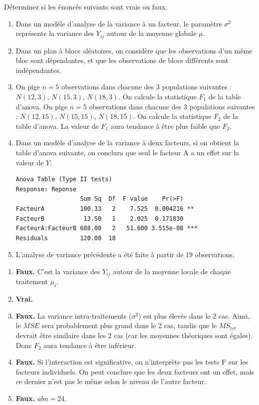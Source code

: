 \begin{exercice}
Déterminez si les énoncés suivants sont vrais ou faux.
\begin{enumerate}[label=(\alph*)]
  \item Dans un modèle d'analyse de la variance à un facteur, le paramètre $\sigma^2$
  représente la variance des $Y_{ij}$ autour de la moyenne globale $\mu$.
  \item Dans un plan à blocs aléatoires, on considère que les observations d'un même bloc
  sont dépendantes, et que les observations de blocs différents sont indépendantes.
  \item On pige $n=5$ observations dans chacune des 3 populations suivantes :
  $N(12,3)$, $N(15,3)$, $N(18,3)$. On calcule la statistique $F_1$ de la table d'anova.
  On pige $n=5$ observations dans chacune des 3 populations suivantes :
  $N(12,15)$, $N(15,15)$, $N(18,15)$. On calcule la statistique $F_2$ de la table d'anova.
  La valeur de $F_1$ aura tendance à être plus faible que $F_2$.
  \item Dans un modèle d'analyse de la variance à deux facteurs, si on obtient la table
  d'anova suivante, on conclura que seul le facteur A a un effet sur la valeur de $Y$.
\begin{verbatim}
Anova Table (Type II tests)
Response: Reponse
                  Sum Sq  Df  F value    Pr(>F)
FacteurA          100.33   2    7.525  0.004216 **
FacteurB           13.50   1    2.025  0.171830
FacteurA:FacteurB 688.00   2   51.600 3.515e-08 ***
Residuals         120.00  18
\end{verbatim}
  \item L'analyse de variance précédente a été faite à partir de 19 observations.
\end{enumerate}
\begin{solution}
\begin{enumerate}[label=(\alph*)]
  \item \textbf{Faux.} C'est la variance des $Y_{ij}$ autour de la moyenne locale de chaque
  traitement $\mu_i$.
  \item \textbf{Vrai.}
  \item \textbf{Faux.} La variance intra-traitements ($\sigma^2$) est plus élevée dans le
  2\ieme{} cas. Ainsi, le $MSE$ sera probablement plus grand dans le 2\ieme{} cas, tandis
  que le $MS_{trt}$ devrait être similaire dans les 2 cas (car les moyennes théoriques sont
  égales). Donc $F_2$ aura tendance à être inférieur.
  \item \textbf{Faux.} Si l'interaction est significative, on n'interprète pas les tests F
  sur les facteurs individuels. On peut conclure que les deux facteurs ont un effet, mais ce
  dernier n'est pas le même selon le niveau de l'autre facteur.
  \item \textbf{Faux.} $abn=24$.
\end{enumerate}
\end{solution}
\end{exercice}

